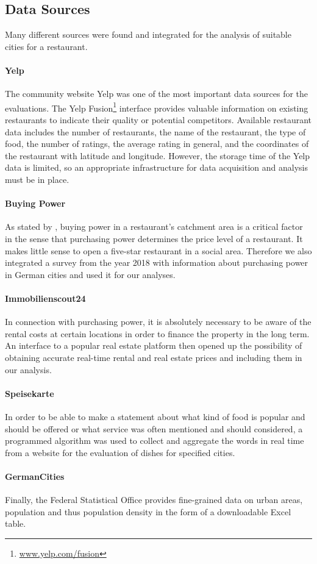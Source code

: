 \subsection{Data Sources}
\label{subsec:sources}
Many different sources were found and integrated for the analysis of suitable cities for a restaurant. 

\paragraph{Yelp}
The community website Yelp was one of the most important data sources for the evaluations. The Yelp Fusion\footnote{\href{https://www.yelp.com/fusion}{www.yelp.com/fusion}} interface provides valuable information on existing restaurants to indicate their quality or potential competitors. Available restaurant data includes the number of restaurants, the name of the restaurant, the type of food, the number of ratings, the average rating in general, and the coordinates of the restaurant with latitude and longitude. However, the storage time of the Yelp data is limited, so an appropriate infrastructure for data acquisition and analysis must be in place.
\newline
\paragraph {Buying Power}
As stated by \cite{locana}, buying power in a restaurant's catchment area is a critical factor in the sense that purchasing power determines the price level of a restaurant. It makes little sense to open a five-star restaurant in a social area. Therefore we also integrated a survey \cite{buyingpower} from the year 2018 with information about purchasing power in German cities and used it for our analyses.
\newline
\paragraph{Immobilienscout24}
In connection with purchasing power, it is absolutely necessary to be aware of the rental costs at certain locations in order to finance the property in the long term\cite{locana}. An interface to a popular real estate platform \cite{ImmoScout} then opened up the possibility of obtaining accurate real-time rental and real estate prices and including them in our analysis.
\newline
\paragraph{Speisekarte}
In order to be able to make a statement about what kind of food is popular and should be offered or what service was often mentioned and should considered, a programmed algorithm was used to collect and aggregate the words in real time from a website \cite{speisekarte} for the evaluation of dishes for specified cities.
\newline
\paragraph{GermanCities}
Finally, the Federal Statistical Office provides fine-grained data on urban areas, population and thus population density in the form of a downloadable Excel table.\cite{destatis}
